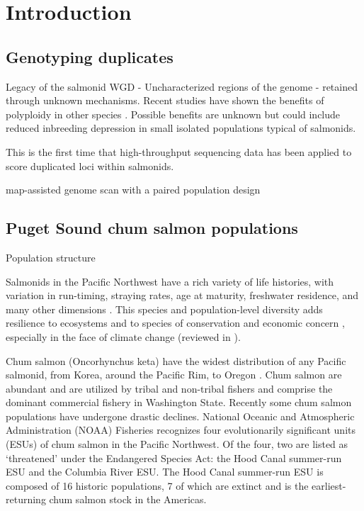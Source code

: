 \documentclass[12pt,  one column]{article}
\begin{document}
\section*{Introduction}

\subsection*{Genotyping duplicates}
Legacy of the salmonid WGD - Uncharacterized regions of the genome - retained through unknown mechanisms.  Recent studies have shown the benefits of polyploidy in other species \citep{Selmecki2015}.  Possible benefits are unknown but could include reduced inbreeding depression in small isolated populations typical of salmonids.

This is the first time that high-throughput sequencing data has been applied to score duplicated loci within salmonids.

map-assisted genome scan with a paired population design

\subsection*{Puget Sound chum salmon populations}
Population structure

Salmonids in the Pacific Northwest have a rich variety of life histories, with variation in run-timing, straying rates, age at maturity, freshwater residence, and many other dimensions \citep{Quinn2005}. This species and population-level diversity adds resilience to ecosystems and to species of conservation and economic concern \citep{Schindler2010}, especially in the face of climate change (reviewed in \citet{Schindler2015}).

Chum salmon (Oncorhynchus keta) have the widest distribution of any Pacific salmonid, from Korea, around the Pacific Rim, to Oregon \citep{Salo1991}. Chum salmon are abundant and are utilized by tribal and non-tribal fishers and comprise the dominant commercial fishery in Washington State. Recently some chum salmon populations have undergone drastic declines.  National Oceanic and Atmospheric Administration (NOAA) Fisheries recognizes four evolutionarily significant units (ESUs) of chum salmon in the Pacific Northwest. Of the four, two are listed as ‘threatened’ under the Endangered Species Act: the Hood Canal summer-run ESU and the Columbia River ESU. The Hood Canal summer-run ESU is composed of 16 historic populations, 7 of which are extinct \citep{Good2005} and is the earliest-returning chum salmon stock in the Americas.
\end{document}
